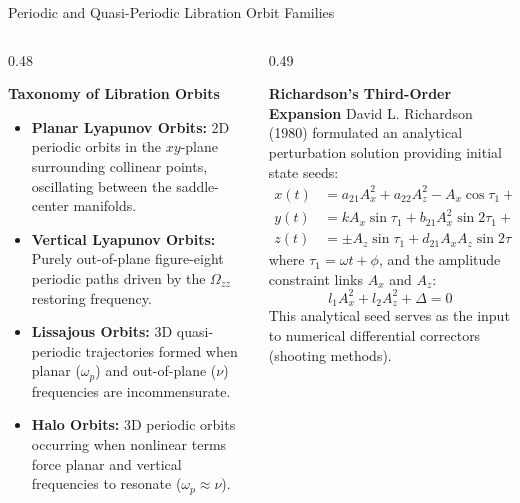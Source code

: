 \documentclass[aspectratio=169, 10pt]{beamer}
\begin{document}
\begin{frame}{Periodic and Quasi-Periodic Libration Orbit Families}
    \begin{columns}[t]
        \begin{column}{0.48\textwidth}
            \begin{block}{\textbf{Taxonomy of Libration Orbits}}
                \scriptsize
                \begin{itemize}\setlength{\itemsep}{3pt}
                    \item \textbf{Planar Lyapunov Orbits:} 2D periodic orbits in the $xy$-plane surrounding collinear points, oscillating between the saddle-center manifolds.
                    \item \textbf{Vertical Lyapunov Orbits:} Purely out-of-plane figure-eight periodic paths driven by the $\Omega_{zz}$ restoring frequency.
                    \item \textbf{Lissajous Orbits:} 3D quasi-periodic trajectories formed when planar ($\omega_p$) and out-of-plane ($\nu$) frequencies are incommensurate.
                    \item \textbf{Halo Orbits:} 3D periodic orbits occurring when nonlinear terms force planar and vertical frequencies to resonate ($\omega_p \approx \nu$).
                \end{itemize}
            \end{block}
        \end{column}
        
        \begin{column}{0.49\textwidth}
            \begin{block}{\textbf{Richardson's Third-Order Expansion}}
                \scriptsize
                David L. Richardson (1980) formulated an analytical perturbation solution providing initial state seeds:
                \begin{align*}
                    x(t) &= a_{21} A_x^2 + a_{22} A_z^2 - A_x \cos\tau_1 + \dots \\
                    y(t) &= k A_x \sin\tau_1 + b_{21} A_x^2 \sin 2\tau_1 + \dots \\
                    z(t) &= \pm A_z \sin\tau_1 + d_{21} A_x A_z \sin 2\tau_1 + \dots
                \end{align*}
                where $\tau_1 = \omega t + \phi$, and the amplitude constraint links $A_x$ and $A_z$:
                \begin{equation*}
                    l_1 A_x^2 + l_2 A_z^2 + \Delta = 0
                \end{equation*}
                This analytical seed serves as the input to numerical differential correctors (shooting methods).
            \end{block}
        \end{column}
    \end{columns}
\end{frame}
\end{document}
